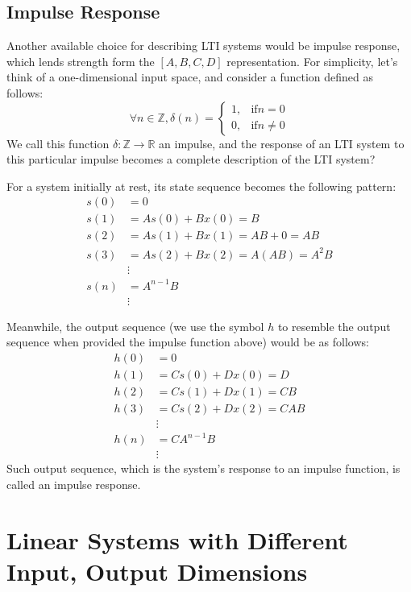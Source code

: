 \subsection{Impulse Response}
Another available choice for describing LTI systems would be impulse response, which lends strength form the $[A, B, C, D]$ representation.
For simplicity, let's think of a one-dimensional input space, and consider a function defined as follows:
\[
    \forall n \in \mathbb{Z}, \delta(n) = \begin{cases}
        1, &\text{if} n = 0 \\
        0, &\text{if} n \neq 0
    \end{cases}
\]
We call this function $\delta: \mathbb{Z} \rightarrow \mathbb{R}$ an impulse, and the response of an LTI system to this particular impulse becomes a complete description of the LTI system?

For a system initially at rest, its state sequence becomes the following pattern:
\begin{align*}
    s(0) &= 0 \\
    s(1) &= A s(0) + B x(0) = B \\
    s(2) &= A s(1) + B x(1) = AB + 0 = AB \\
    s(3) &= A s(2) + B x(2) = A (AB) = A^2 B \\
    &\vdots \\
    s(n) &= A^{n - 1} B \\
    &\vdots
\end{align*}

Meanwhile, the output sequence (we use the symbol $h$ to resemble the output sequence when provided the impulse function above) would be as follows:
\begin{align*}
    h(0) &= 0 \\
    h(1) &= C s(0) + D x(0) = D \\
    h(2) &= C s(1) + D x(1) = CB \\
    h(3) &= C s(2) + D x(2) = CAB \\
    &\vdots \\
    h(n) &= C A^{n - 1} B \\
    &\vdots
\end{align*}
Such output sequence, which is the system's response to an impulse function, is called an impulse response.

\section{Linear Systems with Different Input, Output Dimensions}
